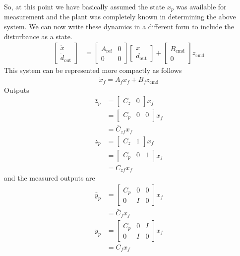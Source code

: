 So, at this point we have basically assumed the state $x_{p}$ was available for measurement and the plant was completely known in determining the above system.
We can now write these dynamics in a different form to include the disturbance as a state.
\begin{align*}
  \begin{bmatrix}
    \dot{x} \\
    \dot{d}_{\text{out}}
  \end{bmatrix}&=
  \begin{bmatrix}
    A_{\text{ref}} & 0 \\
    0 & 0
  \end{bmatrix}
  \begin{bmatrix}
    x \\
    d_{\text{out}}
  \end{bmatrix}+
  \begin{bmatrix}
    B_{\text{cmd}} \\
    0
  \end{bmatrix}z_{\text{cmd}}
\end{align*}
This system can be represented more compactly as follows
\begin{align*}
  \dot{x}_{f}=A_{f}x_{f}+B_{f}z_{\text{cmd}}
\end{align*}
Outputs
\begin{align*}
\bar{z}_{p}&=
  \begin{bmatrix}
  C_{z} & 0
  \end{bmatrix}x_{f} \\
  &=
  \begin{bmatrix}
  C_{p} & 0 & 0
  \end{bmatrix}x_{f} \\
  &=\bar{C}_{zf}x_{f} \\
  z_{p}&=
  \begin{bmatrix}
  C_{z} & 1
  \end{bmatrix}x_{f} \\
  &=
  \begin{bmatrix}
  C_{p} & 0 & 1
  \end{bmatrix}x_{f} \\
  &=C_{zf}x_{f}
\end{align*}
and the measured outputs are
\begin{align*}
  \bar{y}_{p}&=
  \begin{bmatrix}
    C_{p} & 0 & 0 \\
    0 & I & 0
  \end{bmatrix}x_{f} \\
  &=\bar{C}_{f}x_{f} \\
  y_{p}&=
  \begin{bmatrix}
    C_{p} & 0 & I \\
    0 & I & 0
  \end{bmatrix}x_{f} \\
  &=C_{f}x_{f}
\end{align*}
